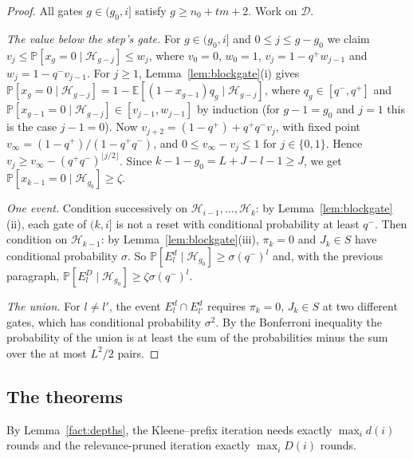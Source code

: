 \documentclass[11pt]{amsart}
\theoremstyle{definition}
\theoremstyle{remark}
\newcommand{\PP}{\mathbb{P}}
\newcommand{\EE}{\mathbb{E}}
\begin{document}
\begin{proof}
All gates $g\in(g_0,i]$ satisfy $g\ge n_0+tm+2$. Work on $\mathcal D$.

\emph{The value below the step's gate.} For $g\in(g_0,i]$ and $0\le j\le g-g_0$ we claim
$v_j\le\PP[x_g=0\mid\mathcal H_{g-j}]\le w_j$, where $v_0=0$, $w_0=1$, $v_j=1-q^+w_{j-1}$ and
$w_j=1-q^-v_{j-1}$. For $j\ge1$, Lemma~\ref{lem:blockgate}(i) gives
$\PP[x_g=0\mid\mathcal H_{g-j}]=1-\EE[(1-x_{g-1})q_g\mid\mathcal H_{g-j}]$, where
$q_g\in[q^-,q^+]$ and $\PP[x_{g-1}=0\mid\mathcal H_{g-j}]\in[v_{j-1},w_{j-1}]$ by induction (for
$g-1=g_0$ and $j=1$ this is the case $j-1=0$). Now $v_{j+2}=(1-q^+)+q^+q^-v_j$, with fixed point
$v_\infty=(1-q^+)/(1-q^+q^-)$, and $0\le v_\infty-v_j\le1$ for $j\in\{0,1\}$. Hence
$v_j\ge v_\infty-(q^+q^-)^{\lfloor j/2\rfloor}$. Since $k-1-g_0=L+J-l-1\ge J$, we get
$\PP[x_{k-1}=0\mid\mathcal H_{g_0}]\ge\zeta$.

\emph{One event.} Condition successively on $\mathcal H_{i-1},\dots,\mathcal H_k$: by
Lemma~\ref{lem:blockgate}(ii), each gate of $(k,i]$ is not a reset with conditional probability at
least $q^-$. Then condition on $\mathcal H_{k-1}$: by Lemma~\ref{lem:blockgate}(iii),
$\pi_k=0$ and $J_k\in S$ have conditional probability $\sigma$. So
$\PP[E^{d}_l\mid\mathcal H_{g_0}]\ge\sigma(q^-)^l$ and, with the previous paragraph,
$\PP[E^{D}_l\mid\mathcal H_{g_0}]\ge\zeta\sigma(q^-)^l$.

\emph{The union.} For $l\ne l'$, the event $E^{d}_l\cap E^{d}_{l'}$ requires $\pi_k=0$, $J_k\in S$
at two different gates, which has conditional probability $\sigma^2$. By the Bonferroni
inequality the probability of the union is at least the sum of the probabilities minus the sum
over the at most $L^2/2$ pairs.
\end{proof}

\subsection{The theorems}

By Lemma~\ref{fact:depths}, the Kleene--prefix iteration needs exactly $\max_id(i)$ rounds and the
relevance-pruned iteration exactly $\max_iD(i)$ rounds.
\end{document}
